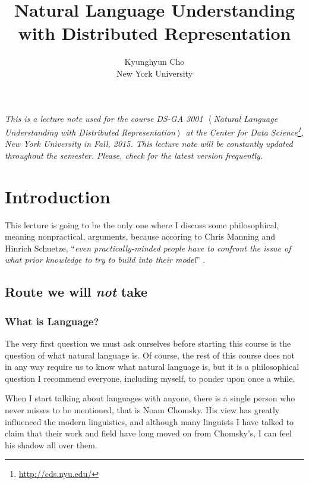 \documentclass{report}
\begin{document}
\title{Natural Language Understanding with Distributed Representation}
\author{Kyunghyun Cho\\New York University}

\maketitle
{}

{\it 
    This is a lecture note used for the course DS-GA 3001 $\left<\right.$Natural
    Language Understanding with Distributed Representation$\left.\right>$ at the
    Center for Data Science\footnote{
        \url{http://cds.nyu.edu/}
    }, New York University in Fall, 2015.  This lecture
    note will be constantly updated throughout the semester. Please, check for
    the latest version frequently.
}

\tableofcontents



\chapter{Introduction}

This lecture is going to be the only one where I discuss some philosophical,
meaning nonpractical, arguments, because accoring to Chris Manning and Hinrich
Schuetze, ``{\it even practically-minded people have to confront the issue of
what prior knowledge to try to build into their model}''
\cite{manning1999foundations}. 

\section{Route we will {\it not} take}
\label{sec:wrong_route}

\subsection{What is Language?}

The very first question we must ask ourselves before starting this course is the
question of what natural language is. Of course, the rest of this course does
not in any way require us to know what natural language is, but it is a
philosophical question I recommend everyone, including myself, to ponder upon
once a while. 

When I start talking about languages with anyone, there is a single person who
never misses to be mentioned, that is Noam Chomsky. His view has greatly
influenced the modern linguistics, and although many linguists I have talked to
claim that their work and field have long moved on from Chomsky's, I can feel
his shadow all over them. 
\end{document}
